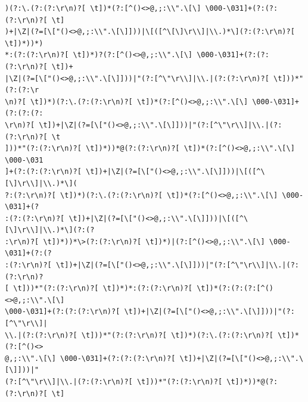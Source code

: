 \documentclass[]{book}
\begin{document}
\begin{verbatim}
)(?:\.(?:(?:\r\n)?[ \t])*(?:[^()<>@,;:\\".\[\] \000-\031]+(?:(?:(?:\r\n)?[ \t]
)+|\Z|(?=[\["()<>@,;:\\".\[\]]))|\[([^\[\]\r\\]|\\.)*\](?:(?:\r\n)?[ \t])*))*)
*:(?:(?:\r\n)?[ \t])*)?(?:[^()<>@,;:\\".\[\] \000-\031]+(?:(?:(?:\r\n)?[ \t])+
|\Z|(?=[\["()<>@,;:\\".\[\]]))|"(?:[^\"\r\\]|\\.|(?:(?:\r\n)?[ \t]))*"(?:(?:\r
\n)?[ \t])*)(?:\.(?:(?:\r\n)?[ \t])*(?:[^()<>@,;:\\".\[\] \000-\031]+(?:(?:(?:
\r\n)?[ \t])+|\Z|(?=[\["()<>@,;:\\".\[\]]))|"(?:[^\"\r\\]|\\.|(?:(?:\r\n)?[ \t
]))*"(?:(?:\r\n)?[ \t])*))*@(?:(?:\r\n)?[ \t])*(?:[^()<>@,;:\\".\[\] \000-\031
]+(?:(?:(?:\r\n)?[ \t])+|\Z|(?=[\["()<>@,;:\\".\[\]]))|\[([^\[\]\r\\]|\\.)*\](
?:(?:\r\n)?[ \t])*)(?:\.(?:(?:\r\n)?[ \t])*(?:[^()<>@,;:\\".\[\] \000-\031]+(?
:(?:(?:\r\n)?[ \t])+|\Z|(?=[\["()<>@,;:\\".\[\]]))|\[([^\[\]\r\\]|\\.)*\](?:(?
:\r\n)?[ \t])*))*\>(?:(?:\r\n)?[ \t])*)|(?:[^()<>@,;:\\".\[\] \000-\031]+(?:(?
:(?:\r\n)?[ \t])+|\Z|(?=[\["()<>@,;:\\".\[\]]))|"(?:[^\"\r\\]|\\.|(?:(?:\r\n)?
[ \t]))*"(?:(?:\r\n)?[ \t])*)*:(?:(?:\r\n)?[ \t])*(?:(?:(?:[^()<>@,;:\\".\[\] 
\000-\031]+(?:(?:(?:\r\n)?[ \t])+|\Z|(?=[\["()<>@,;:\\".\[\]]))|"(?:[^\"\r\\]|
\\.|(?:(?:\r\n)?[ \t]))*"(?:(?:\r\n)?[ \t])*)(?:\.(?:(?:\r\n)?[ \t])*(?:[^()<>
@,;:\\".\[\] \000-\031]+(?:(?:(?:\r\n)?[ \t])+|\Z|(?=[\["()<>@,;:\\".\[\]]))|"
(?:[^\"\r\\]|\\.|(?:(?:\r\n)?[ \t]))*"(?:(?:\r\n)?[ \t])*))*@(?:(?:\r\n)?[ \t]

\end{verbatim}
\end{document}
